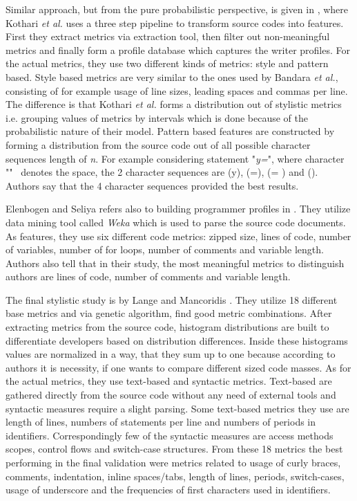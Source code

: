 \documentclass[english]{tktltiki2}
\theoremstyle{definition}
\theoremstyle{remark}
\begin{document}
Similar approach, but from the pure probabilistic perspective, is given in \cite{kothari2007probabilistic}, where Kothari \textit{et al.} uses a three step pipeline to transform source codes into features. First they extract metrics via extraction tool, then filter out non-meaningful metrics and finally form a profile database which captures the writer profiles. For the actual metrics, they use two different kinds of metrics: style and pattern based. Style based metrics are very similar to the ones used by Bandara \textit{et al.}, consisting of for example usage of line sizes, leading spaces and commas per line. The difference is that Kothari \textit{et al.} forms a distribution out of stylistic metrics i.e. grouping values of metrics by intervals which is done because of the probabilistic nature of their model. Pattern based features are constructed by forming a distribution from the source code out of all possible character sequences length of \textit{n}. For example considering statement "\textit{y\textvisiblespace =}", where character "\textvisiblespace" \ denotes the space, the 2 character sequences are (y\textvisiblespace), (\textvisiblespace =), (= \textvisiblespace) and (). Authors say that the 4 character sequences provided the best results.

Elenbogen and Seliya refers also to building programmer profiles in \cite{Elenbogen:2008:DOS:1295109.1295123}. They utilize data mining tool called \textit{Weka} which is used to parse the source code documents. As features, they use six different code metrics: zipped size, lines of code, number of variables, number of for loops, number of comments and variable length. Authors also tell that in their study, the most meaningful metrics to distinguish authors are lines of code, number of comments and variable length.  

The final stylistic study is by Lange and Mancoridis \cite{lange2007using}. They utilize 18 different base metrics and via genetic algorithm, find good metric combinations. After extracting metrics from the source code, histogram distributions are built to differentiate developers based on distribution differences. Inside these histograms values are normalized in a way, that they sum up to one because according to authors it is necessity, if one wants to compare different sized code masses. As for the actual metrics, they use text-based and syntactic metrics. Text-based are gathered directly from the source code without any need of external tools and syntactic measures require a slight parsing. Some text-based   metrics they use are length of lines, numbers of statements per line and numbers of periods in identifiers. Correspondingly few of the syntactic measures are access methods scopes, control flows and switch-case structures. From these 18 metrics the best performing in the final validation were metrics related to usage of curly braces, comments, indentation, inline spaces/tabs, length of lines, periods, switch-cases, usage of underscore and the frequencies of first characters used in identifiers.
 
\end{document}
